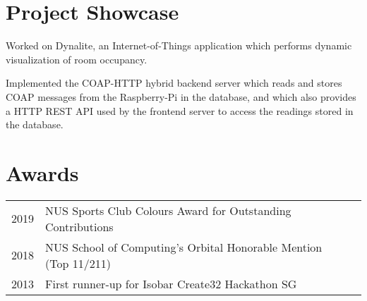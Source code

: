 \documentclass[a4paper]{resume-template} %
\begin{document}
\begin{minipage}[t]{0.60\textwidth}

\section{Project Showcase}
\begin{tightemize}
\item Worked on Dynalite, an Internet-of-Things application which performs dynamic visualization of room occupancy.
\item Implemented the COAP-HTTP hybrid backend server which reads and stores COAP messages from the Raspberry-Pi in the database, and which also provides a HTTP REST API used by the frontend server to access the readings stored in the database.
\end{tightemize}
\sectionsep


\section{Awards} 
\begin{tabular}{rll}
2019 & NUS Sports Club Colours Award for Outstanding Contributions\\
2018 & NUS School of Computing's Orbital Honorable Mention (Top 11/211)\\
2013 & First runner-up for Isobar Create32 Hackathon SG\\
\end{tabular}
\sectionsep

% 


\end{minipage}
\end{document}
